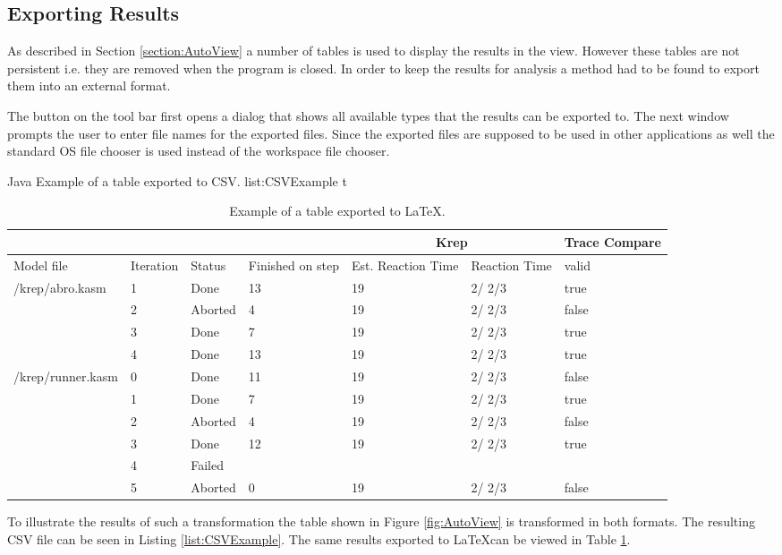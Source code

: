 \subsection{Exporting Results}
\label{section:AutoExportResults}
As described in Section \ref{section:AutoView} a number of tables is used to display the results in the view.
However these tables are not persistent i.e. they are removed when the program is closed.
In order to keep the results for analysis a method had to be found to export them into
an external format.

The button on the tool bar first opens a dialog that shows all available types that the results can
be exported to. The next window prompts the user to enter file names for the exported files.
Since the exported files are supposed to be used in other applications as well the standard 
\ac{OS} file chooser is used instead of the workspace file chooser.

\listingjava
{}
{Java}
{Example of a table exported to CSV.}
{list:CSVExample}
{t}
\begin{table}[t]
\begin{tabular}{| l | p{1.2cm} | p{1.2cm} | p{1.2cm} | p{1cm} | p{1.4cm} | p{0.5cm} | } \hline
\multicolumn{4}{|c|}{}
 & \multicolumn{2}{c|}{Krep}
 & \multicolumn{1}{c|}{Trace Compare}
\\ \hline
Model file & Iteration & Status & Finished on step & Est. Reaction Time & Reaction Time & valid \\ \hline
\multirow{4}{*}{/krep/abro.kasm} & 1 & Done & 13 & 19 & {2/ 2/3} & true \\ 
 & 2 & Aborted & 4 & 19 & {2/ 2/3} & false \\ 
 & 3 & Done & 7 & 19 & {2/ 2/3} & true \\ 
 & 4 & Done & 13 & 19 & {2/ 2/3} & true \\ 
\hline
\multirow{6}{*}{/krep/runner.kasm} & 0 & Done & 11 & 19 & {2/ 2/3} & false \\ 
 & 1 & Done & 7 & 19 & {2/ 2/3} & true \\ 
 & 2 & Aborted & 4 & 19 & {2/ 2/3} & false \\ 
 & 3 & Done & 12 & 19 & {2/ 2/3} & true \\ 
 & 4 & Failed &  &  &  &  \\ 
 & 5 & Aborted & 0 & 19 & {2/ 2/3} & false \\ 
\hline
\end{tabular}
  \caption[Example of a table exported to \LaTeX .]%
  {Example of a table exported to \LaTeX .\protect}
\label{table:LatexExample}
\end{table}
To illustrate the results of such a transformation the table shown in Figure \ref{fig:AutoView} is
transformed in both formats. The resulting \ac{CSV} file can be seen in Listing \ref{list:CSVExample}. The same
results exported to \LaTeX can be viewed in Table \ref{table:LatexExample}.

